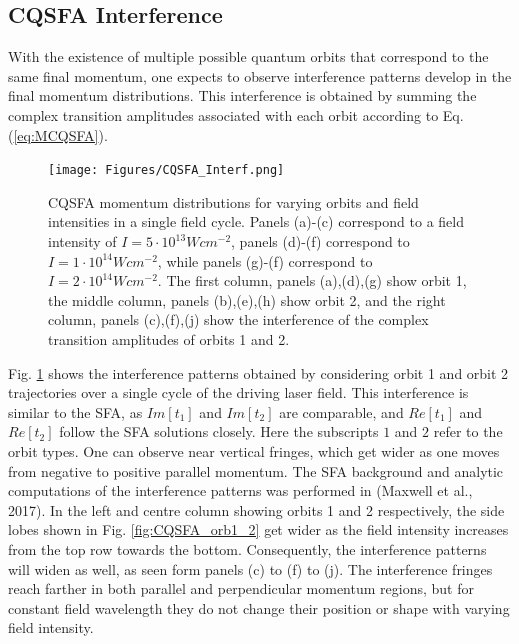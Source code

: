 \documentclass[11pt]{article}
\numberwithin{equation}{section}
\begin{document}
\subsection{CQSFA Interference} \label{ch:CQSFA_interf}

With the existence of multiple possible quantum orbits that correspond to the same final momentum, one expects to observe interference patterns develop in the final momentum distributions. This interference is obtained by summing the complex transition amplitudes associated with each orbit according to Eq. (\ref{eq:MCQSFA}). 
\begin{figure}[!htb]
    \centering
    \texttt{[image: Figures/CQSFA\_Interf.png]}
    \caption{CQSFA momentum distributions for varying orbits and field intensities in a single field cycle. Panels (a)-(c) correspond to a field intensity of $I=5\cdot 10^{13} Wcm^{-2}$, panels (d)-(f) correspond to $I=1\cdot 10^{14} Wcm^{-2}$, while panels (g)-(f) correspond to $I=2\cdot 10^{14} Wcm^{-2}$.
    The first column, panels (a),(d),(g) show orbit 1, the middle column, panels (b),(e),(h) show orbit 2, and the right column, panels (c),(f),(j) show the interference of the complex transition amplitudes of orbits 1 and 2.}
    \label{fig:CQSFA_interf}
\end{figure}
\newline
Fig. \ref{fig:CQSFA_interf} shows the interference patterns obtained by considering orbit 1 and orbit 2 trajectories over a single cycle of the driving laser field. This interference is similar to the SFA, as $Im[t_1]$ and $Im[t_2]$ are comparable, and $Re[t_1]$ and $Re[t_2]$ follow the SFA solutions closely. Here the subscripts $1$ and $2$ refer to the orbit types. One can observe near vertical fringes, which get wider as one moves from negative to positive parallel momentum. The SFA background and analytic computations of the interference patterns was performed in (Maxwell et al., 2017)\cite{maxwell_2017_analytic}.
In the left and centre column showing orbits 1 and 2 respectively, the side lobes shown in Fig. \ref{fig:CQSFA_orb1_2} get wider as the field intensity increases from the top row towards the bottom.  Consequently, the interference patterns will widen as well, as seen form panels (c) to (f) to (j). The interference fringes reach farther in both parallel and perpendicular momentum regions, but for constant field wavelength they do not change their position or shape with varying field intensity.
\end{document}
